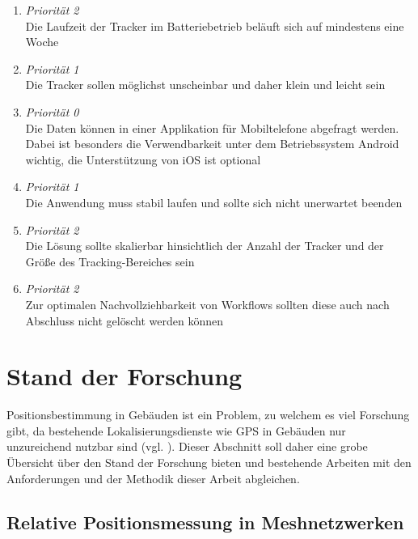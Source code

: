\dotfill

\begin{enumerate}[label=\textbf{NF-\arabic*}]
	\item \label{nf:akku} \textit{Priorität 2}  \\
		Die Laufzeit der Tracker im Batteriebetrieb beläuft sich auf mindestens eine Woche
	\item \label{nf:klein} \textit{Priorität 1}  \\
		Die Tracker sollen möglichst unscheinbar und daher klein und leicht sein
	\item \label{nf:app} \textit{Priorität 0}\\
		Die Daten können in einer Applikation für Mobiltelefone abgefragt werden.  Dabei ist besonders
		die Verwendbarkeit unter dem Betriebssystem Android wichtig, die Unterstützung von iOS ist
		optional
	\item \label{nf:stabilität} \textit{Priorität 1}\\
		Die Anwendung muss stabil laufen und sollte sich nicht unerwartet beenden
	\item \label{nf:skalierbarkeit} \textit{Priorität 2}\\
		Die Lösung sollte skalierbar hinsichtlich der Anzahl der Tracker und der Größe des
		Tracking-Bereiches sein
	\item \label{nf:nachvollziehbarkeit} \textit{Priorität 2}\\
		Zur optimalen Nachvollziehbarkeit von Workflows sollten diese auch nach Abschluss nicht gelöscht
		werden können
\end{enumerate}

\section{Stand der Forschung} \label{sec:stand-der-forschung}

Positionsbestimmung in Gebäuden ist ein Problem, zu welchem es viel Forschung gibt, da bestehende
Lokalisierungsdienste wie \gls{GPS} in Gebäuden nur unzureichend nutzbar sind (vgl. \cite{Liu}). Dieser Abschnitt soll
daher eine grobe Übersicht über den Stand der Forschung bieten und bestehende Arbeiten mit den
Anforderungen und der Methodik dieser Arbeit abgleichen.

\subsection{Relative Positionsmessung in Meshnetzwerken}

